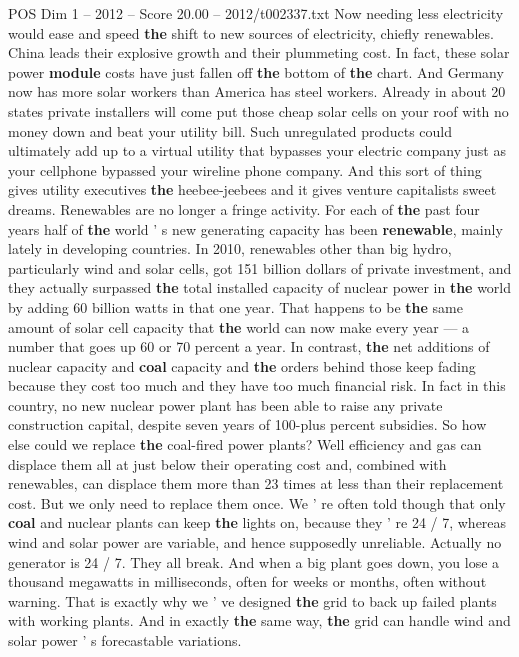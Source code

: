\begin{textsample}{POS Dim 1 – 2012 – Score 20.00 – 2012/t002337.txt}
Now needing less electricity would ease and speed \textbf{the} shift to new sources of electricity, chiefly renewables.
China leads their explosive growth and their plummeting cost.
In fact, these solar power \textbf{module} costs have just fallen off \textbf{the} bottom of \textbf{the} chart.
And Germany now has more solar workers than America has steel workers.
Already in about 20 states private installers will come put those cheap solar cells on your roof with no money down and beat your utility bill.
Such unregulated products could ultimately add up to a virtual utility that bypasses your electric company just as your cellphone bypassed your wireline phone company.
And this sort of thing gives utility executives \textbf{the} heebee-jeebees and it gives venture capitalists sweet dreams.
Renewables are no longer a fringe activity.
For each of \textbf{the} past four years half of \textbf{the} world ' s new generating capacity has been \textbf{renewable}, mainly lately in developing countries.
In 2010, renewables other than big hydro, particularly wind and solar cells, got 151 billion dollars of private investment, and they actually surpassed \textbf{the} total installed capacity of nuclear power in \textbf{the} world by adding 60 billion watts in that one year.
That happens to be \textbf{the} same amount of solar cell capacity that \textbf{the} world can now make every year — a number that goes up 60 or 70 percent a year.
In contrast, \textbf{the} net additions of nuclear capacity and \textbf{coal} capacity and \textbf{the} orders behind those keep fading because they cost too much and they have too much financial risk.
In fact in this country, no new nuclear power plant has been able to raise any private construction capital, despite seven years of 100-plus percent subsidies.
So how else could we replace \textbf{the} coal-fired power plants?
Well efficiency and gas can displace them all at just below their operating cost and, combined with renewables, can displace them more than 23 times at less than their replacement cost.
But we only need to replace them once.
We ' re often told though that only \textbf{coal} and nuclear plants can keep \textbf{the} lights on, because they ' re 24 / 7, whereas wind and solar power are variable, and hence supposedly unreliable.
Actually no generator is 24 / 7.
They all break.
And when a big plant goes down, you lose a thousand megawatts in milliseconds, often for weeks or months, often without warning.
That is exactly why we ' ve designed \textbf{the} grid to back up failed plants with working plants.
And in exactly \textbf{the} same way, \textbf{the} grid can handle wind and solar power ' s forecastable variations.

\end{textsample}

